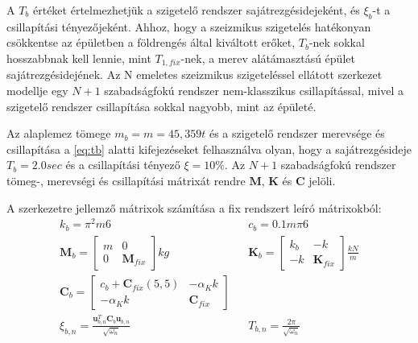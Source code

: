 A $T_b$ értéket értelmezhetjük a szigetelő rendszer sajátrezgésidejeként, és $\xi_b$-t a csillapítási tényezőjeként. Ahhoz, hogy a szeizmikus szigetelés hatékonyan csökkentse az épületben a földrengés által kiváltott erőket, $T_b$-nek sokkal hosszabbnak kell lennie, mint $T_{1,fix}$-nek, a merev alátámasztású épület sajátrezgésidejének. Az N emeletes szeizmikus szigeteléssel ellátott szerkezet modellje egy $N+1$ szabadságfokú rendszer nem-klasszikus csillapítással, mivel a szigetelő rendszer csillapítása sokkal nagyobb, mint az épületé.

 Az alaplemez tömege $m_b = m = 45,359 t$ és a szigetelő rendszer merevsége és csillapítása a \eqref{eq:tb} alatti kifejezéseket felhasználva olyan, hogy a sajátrezgésideje $T_b = 2.0 sec$ és a csillapítási tényező $\xi = 10\%$. Az $N+1$ szabadságfokú rendszer tömeg-, merevségi és csillapítási mátrixát rendre $\mathbf{M}$, $\mathbf{K}$ és $\mathbf{C}$ jelöli.


A szerkezetre jellemző mátrixok számítása a fix rendszert leíró mátrixokból:
\begin{align*}
& k_b = \pi^2m6 & & c_b = 0.1m\pi6& \\
& \mathbf{M}_{b}  = \left[\begin{array}{rr}  m & 0 \\ 0 & \mathbf{M}_{fix} \end{array} \right] kg   &  & \mathbf{K}_{b} =  \left[\begin{array}{rr} k_b & -k \\ -k & \mathbf{K}_{fix} \end{array} \right]\frac{kN}{m}  &  \\
& \mathbf{C}_{b}  = \left[\begin{array}{rr} c_b+\mathbf{C}_{fix}(5,5) & -\alpha_Kk \\ -\alpha_Kk & \mathbf{C}_{fix} \end{array} \right] &  \\
  & \xi_{b,n} = \frac{\mathbf{u}_{b,n}^T\mathbf{C}_{b}\mathbf{u}_{b,n}}{\sqrt{\omega_n}}& & T_{b,n} = \frac{2\pi}{\sqrt{\omega_n}} &  
\end{align*}

